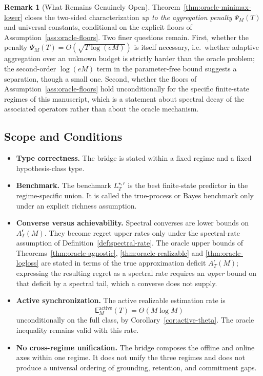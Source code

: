 \documentclass[12pt]{article}
\theoremstyle{definition}
\newtheorem{remark}[theorem]{Remark}
\newcommand{\Est}{\mathsf E}
\newcommand{\Aapp}{A_T}
\newcommand{\PsiAgg}{\Psi}
\begin{document}
\begin{remark}[What Remains Genuinely Open]
\label{rem:oracle-minimax-residual}
Theorem~\ref{thm:oracle-minimax-lower} closes the two-sided characterization
\emph{up to the aggregation penalty} $\PsiAgg_M(T)$ and universal constants,
conditional on the explicit floors of Assumption~\ref{ass:oracle-floors}.  Two
finer questions remain.  First, whether the penalty
$\PsiAgg_M(T)=O(\sqrt{T\log(eM)})$ is itself necessary, i.e.\ whether adaptive
aggregation over an unknown budget is strictly harder than the oracle problem;
the second-order $\log(eM)$ term in the parameter-free bound suggests a
separation, though a small one.  Second, whether the floors of
Assumption~\ref{ass:oracle-floors} hold unconditionally for the specific
finite-state regimes of this manuscript, which is a statement about spectral
decay of the associated operators rather than about the oracle mechanism.
\end{remark}

\subsection{Scope and Conditions}
\label{subsec:oracle-scope}

\begin{itemize}[leftmargin=1.6em]
\item \textbf{Type correctness.}
The bridge is stated within a fixed regime and a fixed hypothesis-class type.

\item \textbf{Benchmark.}
The benchmark $L_T^{\star,\mathsf r}$ is the best finite-state predictor in
the regime-specific union.  It is called the true-process or Bayes benchmark
only under an explicit richness assumption.

\item \textbf{Converse versus achievability.}
Spectral converses are lower bounds on $\Aapp^{\mathsf r}(M)$.  They become
regret upper rates only under the spectral-rate assumption of
Definition~\ref{def:spectral-rate}.  The oracle upper bounds of
Theorems~\ref{thm:oracle-agnostic}, \ref{thm:oracle-realizable} and
\ref{thm:oracle-logloss} are stated in terms of the true approximation deficit
$\Aapp^{\mathsf r}(M)$; expressing the resulting regret as a spectral rate
requires an \emph{upper} bound on that deficit by a spectral tail, which a
converse does not supply.

\item \textbf{Active synchronization.}
The active realizable estimation rate is
\[
\Est_M^{\mathrm{active}}(T)
=
\Theta(M\log M)
\]
unconditionally on the full class, by Corollary~\ref{cor:active-theta}.  The
oracle inequality remains valid with this rate.

\item \textbf{No cross-regime unification.}
The bridge composes the offline and online axes within one regime.  It does
not unify the three regimes and does not produce a universal ordering of
grounding, retention, and commitment gaps.
\end{itemize}
\end{document}
